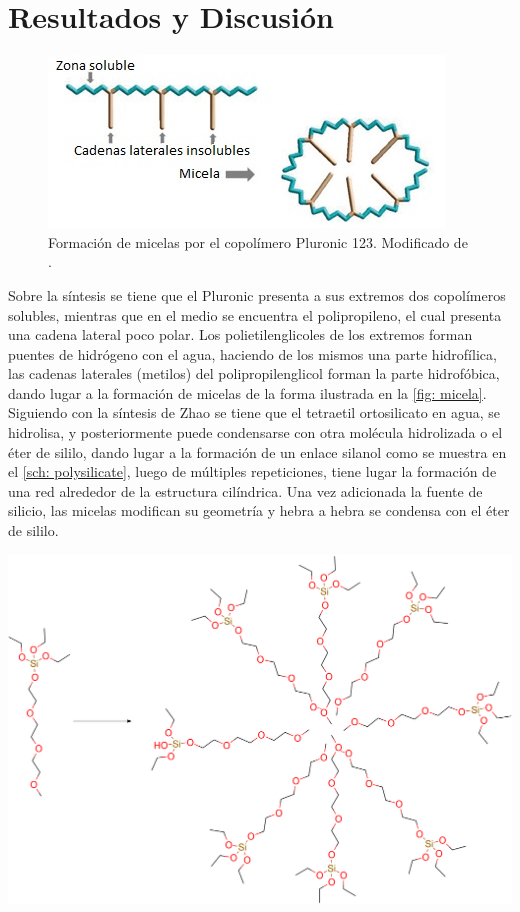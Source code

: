 \documentclass[fleqn,11pt]{SelfArx}
\begin{document}
	\section{Resultados y Discusi\'on}
	\begin{figure}[h]
		\centering
		\includegraphics[width=0.8\linewidth]{structures/Micela.jpg}
		\caption{Formaci\'on de micelas por el copol\'imero Pluronic 123. Modificado de \cite{grallert_rangel_yagui_pasqualoto_tavares_2012}.}
		\label{fig: micela}
	\end{figure}
	\pagebreak
	
	 Sobre la s\'intesis se tiene que el Pluronic presenta a sus extremos dos copol\'imeros solubles, mientras que en el medio se encuentra el polipropileno, el cual presenta una cadena lateral poco polar. Los polietilenglicoles de los extremos forman puentes de hidr\'ogeno con el agua, haciendo de los mismos una parte hidrof\'ilica, las cadenas laterales (metilos) del polipropilenglicol forman la parte hidrof\'obica, dando lugar a la formaci\'on de micelas de la forma ilustrada en la \autoref{fig: micela}. Siguiendo con la s\'intesis de Zhao se tiene que el tetraetil ortosilicato en agua, se hidrolisa, y posteriormente puede condensarse con otra mol\'ecula hidrolizada o el \'eter de sililo, dando lugar a la formaci\'on de un enlace silanol como se muestra en el \autoref{sch: polysilicate}, luego de m\'ultiples repeticiones, tiene lugar la formaci\'on de una red alrededor de la estructura cil\'indrica. Una vez adicionada la fuente de silicio, las micelas modifican su geometr\'ia y hebra a hebra se condensa con el \'eter de sililo.
	\begin{scheme}[h]
		\centering
		\includegraphics[width=0.95\linewidth]{structures/micelaSi.png}
		\caption{Formaci\'on de las micelas con la incorporaci\'on del silicio \cite{yang_2011}.}
		\label{sch: micelaSi1}
	\end{scheme}
	
\end{document}
